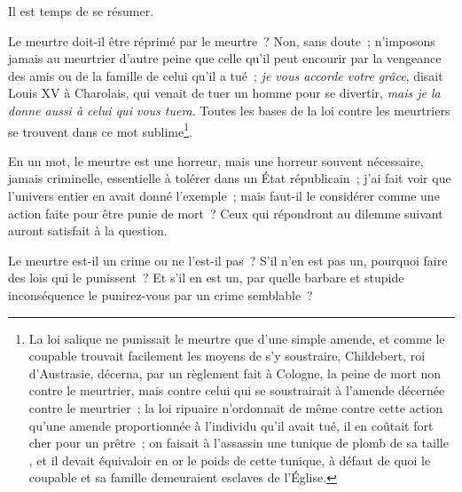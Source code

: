 \documentclass[french,twoside]{book} %
\begin{document}
Il est temps de se résumer.\par
Le meurtre doit-il être réprimé par le meurtre ? Non, sans doute ; n’imposons jamais au meurtrier d’autre peine que celle qu’il peut encourir par la vengeance des amis ou de la famille de celui qu’il a tué ; {\itshape je vous accorde votre grâce}, disait Louis XV à Charolais, qui venait de tuer un homme pour se divertir, {\itshape mais je la donne aussi à celui qui vous tuera}. Toutes les bases de la loi contre les meurtriers se trouvent dans ce mot sublime\footnote{ La loi salique ne punissait le meurtre que d’une simple amende, et comme le coupable trouvait facilement les moyens de s’y soustraire, Childebert, roi d’Austrasie, décerna, par un règlement fait à Cologne, la peine de mort non contre le meurtrier, mais contre celui qui se soustrairait à l’amende décernée contre le meurtrier ; la loi ripuaire n’ordonnait de même contre cette action qu’une amende proportionnée à l’individu qu’il avait tué, il en coûtait fort cher pour un prêtre ; on faisait à l’assassin une tunique de plomb de sa taille , et il devait équivaloir en or le poids de cette tunique, à défaut de quoi le coupable et sa famille demeuraient esclaves de l’Église.}.\par
En un mot, le meurtre est une horreur, mais une horreur souvent nécessaire, jamais criminelle, essentielle à tolérer dans un État républicain ; j’ai fait voir que l’univers entier en avait donné l’exemple ; mais faut-il le considérer comme une action faite pour être punie de mort ? Ceux qui répondront au dilemme suivant auront satisfait à la question.\par
Le meurtre est-il un crime ou ne l’est-il pas ? S’il n’en est pas un, pourquoi faire des lois qui le punissent ? Et s’il en est un, par quelle barbare et stupide inconséquence le punirez-vous par un crime semblable ?\par
\end{document}
